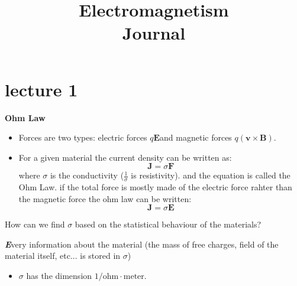 \documentclass[10pt,a4paper,twocolumn]{article}
\title{Electromagnetism \\ Journal}
\newenvironment{callout}
	{\begin{calloutbox}\color{charcoal}\textbf\textit}
	{\end{calloutbox}}
\newcommand{\vect}[1]{\mathbf{#1}}
\newcommand{\cross}{\times}
\begin{document}
          \maketitle
          \tableofcontents
          \section{lecture 1}
               \textbf{Ohm Law}
               \begin{itemize}
                    \item Forces are two types: electric forces $q\vect E$and magnetic forces $q(\vect v \cross \vect B)$.
                    \item For a given material the current density can be written as:
                    \begin{equation}
                         \vect J = \sigma \vect F
                    \end{equation}
                    where $\sigma$ is the conductivity ($\frac1\sigma$ is resistivity). and the equation is called the Ohm Law. if the total force is mostly made of the electric force rahter than the magnetic force the ohm law can be written: 
                    \begin{equation}
                         \vect J = \sigma \vect E
                    \end{equation}              
               \end{itemize}
                                   
               \begin{exc}
                    How can we find $\sigma$ based on the statistical behaviour of the materials?
               \end{exc}

               \begin{callout}
                    Every information about the material (the mass of free charges, field of the material itself, etc... is stored in $\sigma$)
               \end{callout}
               \begin{itemize}
                    \item $\sigma$ has the dimension $1/\text{ohm}\cdot \text{meter}$.
               \end{itemize}
\end{document}
